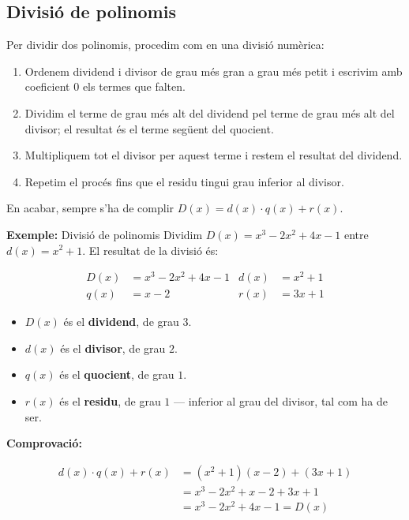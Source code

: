 \subsection{Divisió de polinomis}

Per dividir dos polinomis, procedim com en una divisió numèrica:

\begin{enumerate}
\item Ordenem dividend i divisor de grau més gran a grau més petit i escrivim amb coeficient $0$ els termes que falten.
\item Dividim el terme de grau més alt del dividend pel terme de grau més alt del divisor; el resultat és el terme següent del quocient.
\item Multipliquem tot el divisor per aquest terme i restem el resultat del dividend.
\item Repetim el procés fins que el residu tingui grau inferior al divisor.
\end{enumerate}

En acabar, sempre s'ha de complir $D(x)=d(x)\cdot q(x)+r(x)$.

\begin{exemple}{\textbf{Exemple:} Divisió de polinomis}
Dividim $D(x) = x^3 - 2x^2 + 4x - 1$ entre $d(x) = x^2+1$. El resultat de la divisió és:

\[
\begin{aligned}
D(x) &= x^3-2x^2+4x-1 & d(x) &= x^2+1 \\
q(x) &= x-2 & r(x) &= 3x+1
\end{aligned}
\]

\begin{itemize}
\item $D(x)$ és el \textbf{dividend}, de grau $3$.
\item $d(x)$ és el \textbf{divisor}, de grau $2$.
\item $q(x)$ és el \textbf{quocient}, de grau $1$.
\item $r(x)$ és el \textbf{residu}, de grau $1$ — inferior al grau del divisor, tal com ha de ser.
\end{itemize}

\textbf{Comprovació:}

\[
\begin{aligned}
d(x)\cdot q(x) + r(x) &= (x^2+1)(x-2) + (3x+1) \\
&= x^3-2x^2+x-2+3x+1 \\
&= x^3-2x^2+4x-1 = D(x)
\end{aligned}
\]
\end{exemple}

